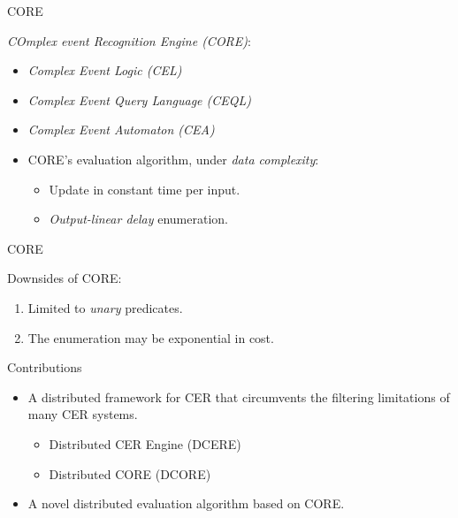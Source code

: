 \documentclass[xcolor=pdftex,dvipsnames,table]{beamer}
\begin{document}

\begin{frame}{CORE}
  \begin{block}{}
   \emph{COmplex event Recognition Engine (CORE)\cite{core}}:
   \begin{itemize}
     \pause
     \item \emph{Complex Event Logic (CEL)}
     \pause
     \item \emph{Complex Event Query Language (CEQL)}
     \pause
     \item \emph{Complex Event Automaton (CEA)}
     \pause
     \item CORE's evaluation algorithm, under \emph{data complexity}:
      \begin{itemize}
        \pause
        \item Update in constant time per input.
        \pause
        \item \emph{Output-linear delay} enumeration.
      \end{itemize}
   \end{itemize}
 \end{block}
\end{frame}

\begin{frame}{CORE}
  \begin{block}{}
    Downsides of CORE:
   \begin{enumerate}
     \pause
     \item Limited to \emph{unary} predicates.
     \pause
     \item The enumeration may be exponential in cost.
   \end{enumerate}
 \end{block}
\end{frame}


\begin{frame}{Contributions}
  \begin{block}{}
   \begin{itemize}
     \item A distributed framework for CER that circumvents the filtering limitations of many CER systems.
      \begin{itemize}
        \pause
        \item Distributed CER Engine (DCERE)
        \pause
        \item Distributed CORE (DCORE)
      \end{itemize}
     \pause
     \item A novel distributed evaluation algorithm based on CORE.
   \end{itemize}
 \end{block}
\end{frame}
\end{document}
